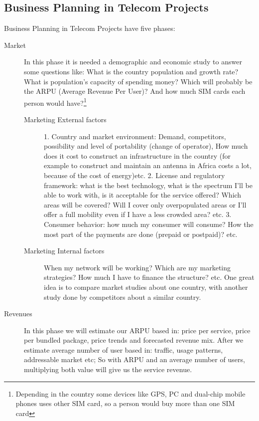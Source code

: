 \documentclass[a4paper,11pt]{article}
\begin{document}
\subsection{Business Planning in Telecom Projects}
Business Planning in Telecom Projects have five phases:

\begin{description}
\item[Market] In this phase it is needed a demographic and economic study to 
  answer some questions like: What is the  country population and growth  rate? What is  population's capacity of
  spending money?  Which will probably be  the ARPU (Average  Revenue Per User)?
  And  how much  SIM cards  each  person would  have?\footnote{Depending in  the
    country some devices like GPS, PC and dual-chip mobile phones uses other SIM card, so a
    person would buy more than one SIM card} 
\begin{description}
\item[Marketing External factors] {\color{blue}1.  Country and market environment:} Demand,
  competitors, possibility  and level of  portability (change of  operator), How
  much does it cost  to construct  an infrastructure  in the  country (for  example to
  construct and maintain an antenna in Africa costs a lot, because of the cost of energy)etc. {\color{blue}2.  License and
  regulatory framework:} what is the best technology, what is the spectrum I'll
  be able  to work with, is it  acceptable for the service  offered? Which areas
  will be  covered? Will I cover only  overpopulated areas or I'll  offer a full
  mobility even if  I have a less crowded area? etc.  {\color{blue}3. Consumer behavior:} how
  much my  consumer will  consume? How the  most part  of the payments  are done
  (prepaid or postpaid)? etc.

\item[Marketing Internal factors] When my  network will be working? Which are my
  marketing strategies? How much I have to finance the structure?  etc. One 
  great idea is to compare market studies about one country, with another study
  done by competitors about a similar country.

\end{description}

\item[Revenues] In  this phase we  will estimate our  ARPU based in:  price per
  service,  price  per bundled  package,  price  trends  and forecasted  revenue
  mix.  After  we estimate  average  number of  user  based  in: traffic,  usage
  patterns, addressable market etc; So with {\color{red}ARPU} and an {\color{red}average number of users},
  multiplying both value will give us the {\color{red}service revenue.}


\end{description}
\end{document}
